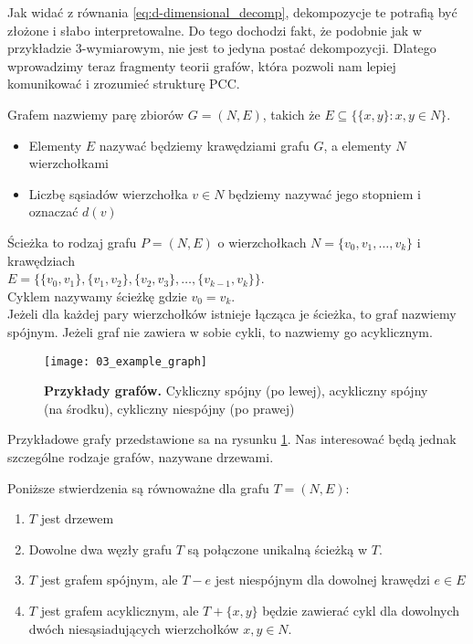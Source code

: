 Jak widać z równania \ref{eq:d-dimensional_decomp}, dekompozycje te potrafią być złożone i słabo interpretowalne. Do tego dochodzi fakt, że podobnie jak w przykładzie 3-wymiarowym, nie jest to jedyna postać dekompozycji. Dlatego wprowadzimy teraz fragmenty teorii grafów, która pozwoli nam lepiej komunikować i zrozumieć strukturę PCC.

\begin{df}
	Grafem nazwiemy parę zbiorów $G= (N, E)$, takich że $E \subseteq \{ \{x,y \}: x,y \in N \}$.
	\begin{itemize}
		\item Elementy $E$ nazywać będziemy krawędziami grafu $G$, a elementy $N$ wierzchołkami
		\item Liczbę sąsiadów wierzchołka $v\in N$ będziemy nazywać jego stopniem i oznaczać $d(v)$
	\end{itemize}
\end{df}

\begin{df}
	Ścieżka to rodzaj grafu $P = (N, E)$ o wierzchołkach $N = \{ v_0, v_1, \dots, v_k\}$ i krawędziach \\ $E = \{ \{v_0, v_1 \}, \{v_1, v_2 \}, \{v_2, v_3 \}, \dots, \{v_{k-1}, v_k \} \}$.\\
	Cyklem nazywamy ścieżkę gdzie $v_0=v_k$.\\
	Jeżeli dla każdej pary wierzchołków istnieje łącząca je ścieżka, to graf nazwiemy spójnym. Jeżeli graf nie zawiera w sobie cykli, to nazwiemy go acyklicznym. 
\end{df}

\begin{figure}[h]
	\centering
	\texttt{[image: 03\_example\_graph]}
	
	\caption{\textbf{Przykłady grafów.} Cykliczny spójny (po lewej), acykliczny spójny (na środku), cykliczny niespójny (po prawej)\label{fig:example_graph}}
\end{figure}

Przykładowe grafy przedstawione sa na rysunku \ref{fig:example_graph}. Nas interesować będą jednak szczególne rodzaje grafów, nazywane drzewami.
\begin{df}
	Poniższe stwierdzenia są równoważne dla grafu $T = (N, E)$:
	\begin{enumerate}
		\item $T$ jest drzewem
		\item Dowolne dwa węzły grafu $T$ są połączone unikalną ścieżką w $T$.
		\item $T$ jest grafem spójnym, ale $T-e$ jest niespójnym dla dowolnej krawędzi $e\in E$
		\item $T$ jest grafem acyklicznym, ale $T +\{x,y\}$ będzie zawierać cykl dla dowolnych dwóch niesąsiadujących wierzchołków $x, y \in N$.
	\end{enumerate}
\end{df}

